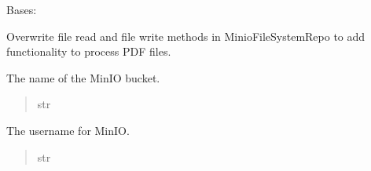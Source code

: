\documentclass[letterpaper,10pt,english]{sphinxmanual}
\begin{document}
\begin{fulllineitems}
\label{\detokenize{src:src.db_utils.minio.MinioFileSystem}}
\pysigstartsignatures
{}
\pysigstopsignatures
\sphinxAtStartPar
Bases: {\hyperref[\detokenize{src:src.db_utils.minio.MinioFileSystemRepo}]{}}

\sphinxAtStartPar
Overwrite file read and file write methods in MinioFileSystemRepo to add functionality to process PDF files.

\begin{fulllineitems}
\label{\detokenize{src:src.db_utils.minio.MinioFileSystem.bucket_name}}
\pysigstartsignatures
{}
\pysigstopsignatures
\sphinxAtStartPar
The name of the MinIO bucket.
\begin{quote}\begin{description}
\sphinxAtStartPar
str

\end{description}\end{quote}

\end{fulllineitems}


\begin{fulllineitems}
\label{\detokenize{src:src.db_utils.minio.MinioFileSystem.user}}
\pysigstartsignatures
{}
\pysigstopsignatures
\sphinxAtStartPar
The username for MinIO.
\begin{quote}\begin{description}
\sphinxAtStartPar
str

\end{description}\end{quote}

\end{fulllineitems}



\end{fulllineitems}
\end{document}
